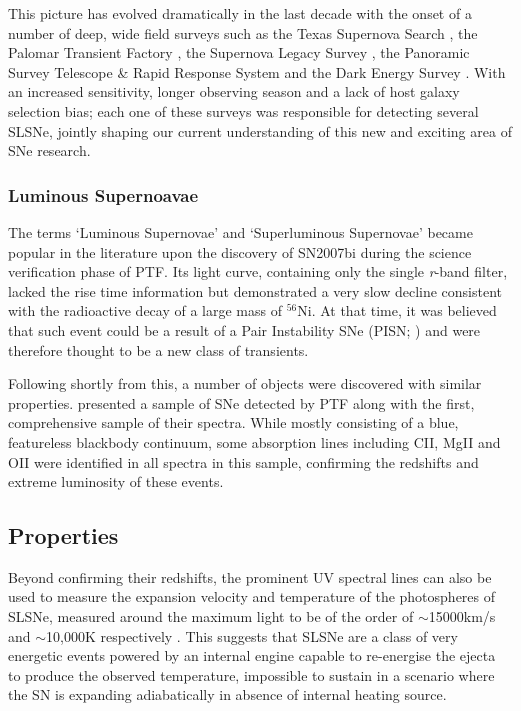This picture has evolved dramatically in the last decade with the onset of a number of deep, wide field surveys such as the Texas Supernova Search \citep[TSS;][]{Quimby2006}, the Palomar Transient Factory \citep[PTF;][]{Law2009, Rau2009}, the Supernova Legacy Survey \citep[SNLS;][]{Astier2005,Guy2010,Perrett2010}, the Panoramic Survey Telescope \& Rapid Response System \citep[Pan-STARRS;][]{Kaiser2010} and the Dark Energy Survey \citep[DES;][]{Flaugher2005}. With an increased sensitivity, longer observing season and a lack of host galaxy selection bias; each one of these surveys was responsible for detecting several SLSNe, jointly shaping our current understanding of this new and exciting area of SNe research.

\subsubsection{Luminous Supernoavae}
The terms `Luminous Supernovae' and `Superluminous Supernovae' became popular in the literature upon the discovery of SN2007bi \citep{Gal-Yam2009} during the science verification phase of PTF. Its light curve, containing only the single \textit{r}-band filter, lacked the rise time information but demonstrated a very slow decline consistent with the radioactive decay of a large mass of $^{56}$Ni. At that time, it was believed that such event could be a result of a Pair Instability SNe (PISN; ) and were therefore thought to be a new class of transients.

Following shortly from this, a number of objects were discovered with similar properties. \citet{Quimby2011} presented a sample of SNe detected by PTF along with the first, comprehensive sample of their spectra. While mostly consisting of a blue, featureless blackbody continuum, some absorption lines including CII, MgII and OII \citep[see ][for more recent line identification]{Mazzali2015a} were identified in all spectra in this sample, confirming the redshifts and extreme luminosity of these events.

\subsection{Properties}
Beyond confirming their redshifts, the prominent UV spectral lines can also be used to measure the expansion velocity and temperature of the photospheres of SLSNe, measured around the maximum light to be of the order of $\sim$15000km/s and $\sim$10,000K respectively \citep{Inserra2013}. This suggests that SLSNe are a class of very energetic events powered by an internal engine capable to re-energise the ejecta to produce the observed temperature, impossible to sustain in a scenario where the SN is expanding adiabatically in absence of internal heating source.

